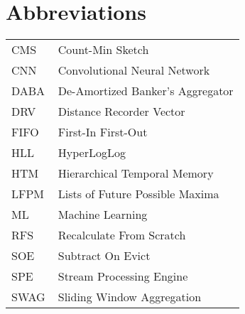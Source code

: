 \chapter*{Abbreviations}

\begin{flushleft}
\begin{tabular}{l p{0.8\linewidth}}
CMS      & Count-Min Sketch\\
CNN      & Convolutional Neural Network\\
DABA     & De-Amortized Banker’s Aggregator\\
DRV      & Distance Recorder Vector\\
FIFO     & First-In First-Out\\
HLL      & HyperLogLog\\
HTM      & Hierarchical Temporal Memory\\
LFPM     & Lists of Future Possible Maxima\\ 
ML       & Machine Learning\\
RFS      & Recalculate From Scratch\\
SOE      & Subtract On Evict\\
SPE      & Stream Processing Engine\\
SWAG     & Sliding Window Aggregation\\
\end{tabular}
\end{flushleft}

